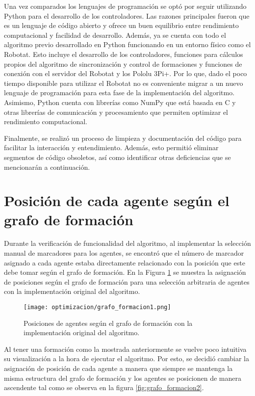 Una vez comparados los lenguajes de programación se optó por seguir utilizando Python para el desarrollo de los controladores. Las razones principales fueron que es un lenguaje de código abierto y ofrece un buen equilibrio entre rendimiento computacional y facilidad de desarrollo. Además, ya se cuenta con todo el algoritmo previo desarrollado en Python funcionando en un entorno físico como el Robotat. Esto incluye el desarrollo de los controladores, funciones para cálculos propios del algoritmo de sincronización y control de formaciones y funciones de conexión con el servidor del Robotat y los Pololu 3Pi+. Por lo que, dado el poco tiempo disponible para utilizar el Robotat no es conveniente migrar a un nuevo lenguaje de programación para esta fase de la implementación del algoritmo. Asimismo, Python cuenta con librerías como NumPy que está basada en C y otras librerías de comunicación y procesamiento que permiten optimizar el rendimiento computacional.

Finalmente, se realizó un proceso de limpieza y documentación del código para facilitar la interacción y entendimiento. Además, esto permitió eliminar segmentos de código obsoletos, así como identificar otras deficiencias que se mencionarán a continuación.

\section{Posición de cada agente según el grafo de formación}
Durante la verificación de funcionalidad del algoritmo, al implementar la selección manual de marcadores para los agentes, se encontró que el número de marcador asignado a cada agente estaba directamente relacionado con la posición que este debe tomar según el grafo de formación. En la Figura \ref{fig:grafo_formacion1} se muestra la asignación de posiciones según el grafo de formación para una selección arbitraria de agentes con la implementación original del algoritmo.

\begin{figure}[H]
	\centering
	\texttt{[image: optimizacion/grafo\_formacion1.png]}
	\caption{Posiciones de agentes según el grafo de formación con la implementación original del algoritmo.}
	\label{fig:grafo_formacion1}
\end{figure}

Al tener una formación como la mostrada anteriormente se vuelve poco intuitiva su visualización a la hora de ejecutar el algoritmo. Por esto, se decidió cambiar la asignación de posición de cada agente a manera que siempre se mantenga la misma estructura del grafo de formación y los agentes se posicionen de manera ascendente tal como se observa en la figura \ref{fig:grafo_formacion2}.

